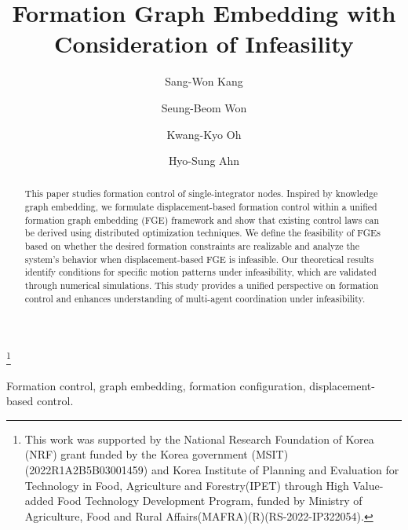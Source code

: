\documentclass{ifacconf}
\begin{document}
\begin{frontmatter}


\title{Formation Graph Embedding with Consideration of Infeasility} 

\thanks[footnoteinfo]{This work was supported by the National Research Foundation of Korea (NRF) grant funded by the Korea government (MSIT) (2022R1A2B5B03001459) and Korea Institute of Planning and Evaluation for Technology in Food, Agriculture and Forestry(IPET) through High Value-added Food Technology Development Program, funded by Ministry of Agriculture, Food and Rural Affairs(MAFRA)(R)(RS-2022-IP322054).}

\author[First]{Sang-Won Kang} 
\author[First]{Seung-Beom Won}
\author[Second]{Kwang-Kyo Oh}
\author[First]{Hyo-Sung Ahn} 


\address[First]{Department of Mechanical and Robotics Engineering, Gwangju Institute of Science and Technology(GIST), Gwangju, 61005, Republic of Korea, (e-mail:tony9707@gm.gist.ac.kr, sbwon1916@gm.gist.ac.kr, hyosung@gist.ac.kr)}
\address[Second]{Department of Electrical Engineering, Sunchon National University, Sunchon, Republic of Korea, (e-mail:kkoh@scnu.ac.kr)}

\begin{abstract}                %
This paper studies formation control of single-integrator nodes. Inspired by knowledge graph embedding, we formulate displacement-based formation control within a unified formation graph embedding (FGE) framework and show that existing control laws can be derived using distributed optimization techniques. We define the feasibility of FGEs based on whether the desired formation constraints are realizable and analyze the system's behavior when displacement-based FGE is infeasible. Our theoretical results identify conditions for specific motion patterns under infeasibility, which are validated through numerical simulations. This study provides a unified perspective on formation control and enhances understanding of multi-agent coordination under infeasibility.
\end{abstract}

\begin{keyword}
Formation control, graph embedding, formation configuration, displacement-based control.
\end{keyword}

\end{frontmatter}
\end{document}
